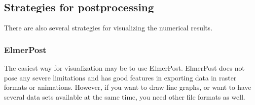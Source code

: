





\subsection{Strategies for postprocessing}

There are also several strategies for visualizing the numerical results.


\subsubsection*{ElmerPost}
The easiest way for visualization may be to use ElmerPost. ElmerPost does not pose any severe limitations 
and has good features in exporting data in raster formats or animations.
However, if you want to draw line graphs, or want to have several data sets available at the same
time, you need other file formats as well. 


